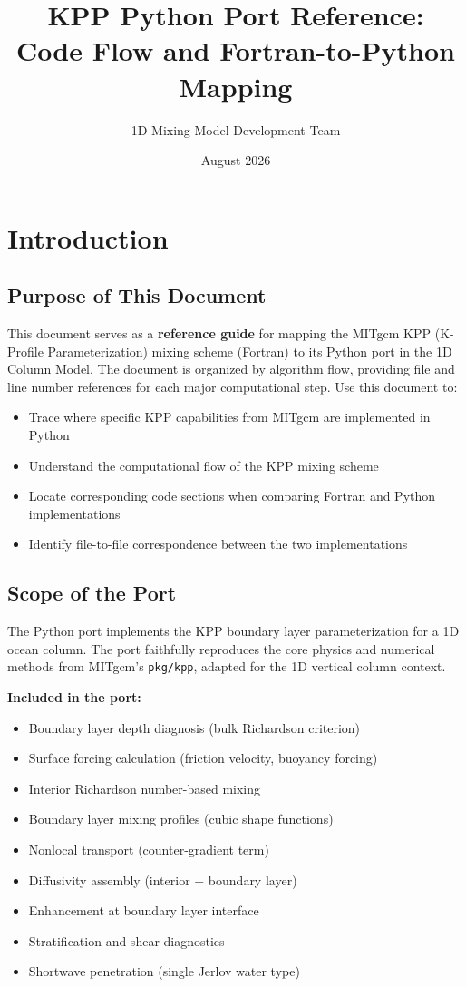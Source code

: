 \documentclass[11pt]{article}
\title{KPP Python Port Reference:\\
       Code Flow and Fortran-to-Python Mapping}
\author{1D Mixing Model Development Team}
\date{August 2026}
\begin{document}
\maketitle
\tableofcontents
\newpage

\section{Introduction}
\label{sec:introduction}

\subsection{Purpose of This Document}

This document serves as a \textbf{reference guide} for mapping the MITgcm KPP (K-Profile Parameterization) mixing scheme (Fortran) to its Python port in the 1D Column Model. The document is organized by algorithm flow, providing file and line number references for each major computational step. Use this document to:

\begin{itemize}
    \item Trace where specific KPP capabilities from MITgcm are implemented in Python
    \item Understand the computational flow of the KPP mixing scheme
    \item Locate corresponding code sections when comparing Fortran and Python implementations
    \item Identify file-to-file correspondence between the two implementations
\end{itemize}

\subsection{Scope of the Port}

The Python port implements the KPP boundary layer parameterization for a 1D ocean column. The port faithfully reproduces the core physics and numerical methods from MITgcm's \verb|pkg/kpp|, adapted for the 1D vertical column context.

\textbf{Included in the port:}
\begin{itemize}
    \item Boundary layer depth diagnosis (bulk Richardson criterion)
    \item Surface forcing calculation (friction velocity, buoyancy forcing)
    \item Interior Richardson number-based mixing
    \item Boundary layer mixing profiles (cubic shape functions)
    \item Nonlocal transport (counter-gradient term)
    \item Diffusivity assembly (interior + boundary layer)
    \item Enhancement at boundary layer interface
    \item Stratification and shear diagnostics
    \item Shortwave penetration (single Jerlov water type)
\end{itemize}
\end{document}

